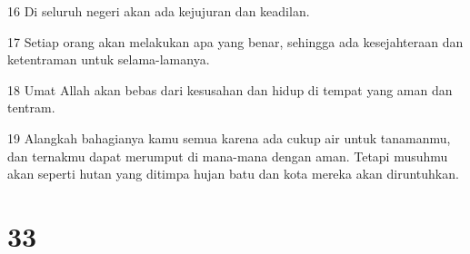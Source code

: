 \par 16 Di seluruh negeri akan ada kejujuran dan keadilan.
\par 17 Setiap orang akan melakukan apa yang benar, sehingga ada kesejahteraan dan ketentraman untuk selama-lamanya.
\par 18 Umat Allah akan bebas dari kesusahan dan hidup di tempat yang aman dan tentram.
\par 19 Alangkah bahagianya kamu semua karena ada cukup air untuk tanamanmu, dan ternakmu dapat merumput di mana-mana dengan aman. Tetapi musuhmu akan seperti hutan yang ditimpa hujan batu dan kota mereka akan diruntuhkan.

\chapter{33}

